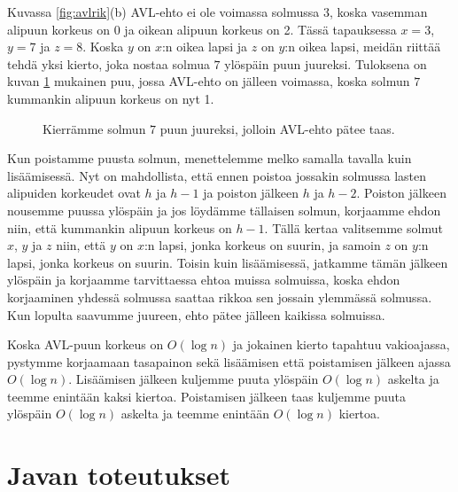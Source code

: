 Kuvassa \ref{fig:avlrik}(b) AVL-ehto ei ole voimassa solmussa $3$,
koska vasemman alipuun korkeus on 0 ja oikean alipuun korkeus on 2.
Tässä tapauksessa $x=3$, $y=7$ ja $z=8$.
Koska $y$ on $x$:n oikea lapsi ja $z$ on $y$:n oikea lapsi,
meidän riittää tehdä yksi kierto, joka nostaa solmua $7$ ylöspäin
puun juureksi.
Tuloksena on kuvan \ref{fig:avlkor} mukainen puu, jossa
AVL-ehto on jälleen voimassa,
koska solmun $7$ kummankin alipuun korkeus on nyt 1.

\begin{figure}
\center
{}
\caption{Kierrämme solmun $7$ puun juureksi, jolloin AVL-ehto pätee taas.}
\label{fig:avlkor}
\end{figure}

Kun poistamme puusta solmun, menettelemme melko samalla tavalla
kuin lisäämisessä.
Nyt on mahdollista, että ennen poistoa
jossakin solmussa lasten alipuiden korkeudet ovat $h$ ja $h-1$
ja poiston jälkeen $h$ ja $h-2$.
Poiston jälkeen nousemme puussa ylöspäin ja jos löydämme
tällaisen solmun, korjaamme ehdon niin, että kummankin alipuun
korkeus on $h-1$.
Tällä kertaa valitsemme solmut $x$, $y$ ja $z$ niin,
että $y$ on $x$:n lapsi, jonka korkeus on suurin,
ja samoin $z$ on $y$:n lapsi, jonka korkeus on suurin.
Toisin kuin lisäämisessä, jatkamme tämän jälkeen ylöspäin
ja korjaamme tarvittaessa ehtoa muissa solmuissa,
koska ehdon korjaaminen yhdessä solmussa saattaa rikkoa
sen jossain ylemmässä solmussa.
Kun lopulta saavumme juureen, ehto pätee jälleen kaikissa solmuissa.

Koska AVL-puun korkeus on $O(\log n)$ ja jokainen kierto
tapahtuu vakioajassa,
pystymme korjaamaan tasapainon sekä lisäämisen että poistamisen
jälkeen ajassa $O(\log n)$.
Lisäämisen jälkeen kuljemme puuta ylöspäin $O(\log n)$ askelta
ja teemme enintään kaksi kiertoa.
Poistamisen jälkeen taas kuljemme puuta ylöspäin $O(\log n)$ askelta
ja teemme enintään $O(\log n)$ kiertoa.

\section{Javan toteutukset}

